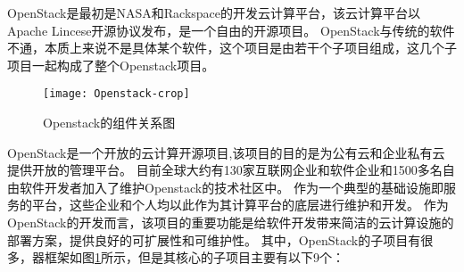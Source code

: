 OpenStack是最初是NASA和Rackspace的开发云计算平台，该云计算平台以Apache Lincese开源协议发布，是一个自由的开源项目。
OpenStack与传统的软件不通，本质上来说不是具体某个软件，这个项目是由若干个子项目组成，这几个子项目一起构成了整个Openstack项目。
\begin{figure}[htbp]
\centering\texttt{[image: Openstack-crop]}
\caption{Openstack的组件关系图}\label{fig:Openstack}
\end{figure}
OpenStack是一个开放的云计算开源项目,该项目的目的是为公有云和企业私有云提供开放的管理平台。
目前全球大约有130家互联网企业和软件企业和1500多名自由软件开发者加入了维护Openstack的技术社区中。
作为一个典型的基础设施即服务的平台，这些企业和个人均以此作为其计算平台的底层进行维护和开发。
作为OpenStack的开发而言，该项目的重要功能是给软件开发带来简洁的云计算设施的部署方案，提供良好的可扩展性和可维护性。
其中，OpenStack的子项目有很多，器框架如图\ref{fig:Openstack}所示，但是其核心的子项目主要有以下9个：
